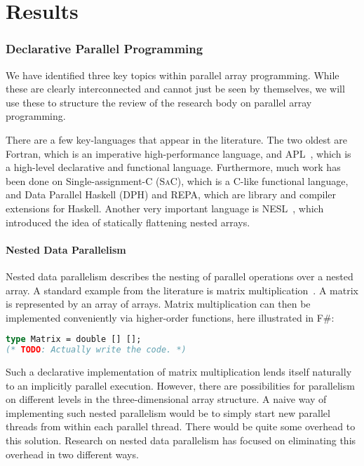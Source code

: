 \documentclass[a4paper]{article}
\newcommand{\sac}{S\textsc{a}C}
\begin{document}
\newpage{}
\part{Results}
\label{part:results}

\section{Declarative Parallel Programming}
\label{sec:declarative-parallel-programming}

We have identified three key topics within parallel array
programming. While these are clearly interconnected and cannot just be
seen by themselves, we will use these to structure the review of the
research body on parallel array programming.

There are a few key-languages that appear in the literature. The two
oldest are Fortran, which is an imperative
high-performance language, and APL~\cite{Iverson1962Programming},
which is a high-level declarative and functional
language. Furthermore, much work has been done on Single-assignment-C
(\sac), which is a C-like functional language, and Data
Parallel Haskell (DPH) and REPA, which are library and
compiler extensions for Haskell. Another very important language is
NESL~\cite{Blelloch1993NESL}, which introduced the idea of statically
flattening nested arrays.

\subsection{Nested Data Parallelism}
\label{sec:nest-data-parall}

Nested data parallelism describes the nesting of parallel operations
over a nested array. A standard example from the literature is matrix
multiplication~\cite{Keller:2010:RSP:1863543.1863582}. A matrix is
represented by an array of arrays. Matrix multiplication can then be
implemented conveniently via higher-order functions, here illustrated
in F\#:

\begin{lstlisting}[language=ML]
type Matrix = double [] [];
(* TODO: Actually write the code. *)
\end{lstlisting}

Such a declarative implementation of matrix multiplication lends
itself naturally to an implicitly parallel execution. However, there
are possibilities for parallelism on different levels in the
three-dimensional array structure. A naive way of implementing such
nested parallelism would be to simply start new parallel threads from
within each parallel thread. There would be quite some overhead to
this solution. Research on nested data parallelism has focused on
eliminating this overhead in two different ways.
\end{document}
